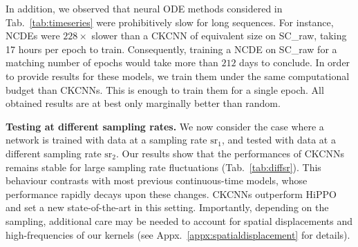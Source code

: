 \documentclass{article}
\begin{document}
In addition, we observed that neural ODE methods considered in Tab.~\ref{tab:timeseries} were prohibitively slow for long sequences. For instance, NCDEs were $228\times$ slower than a CKCNN of equivalent size on SC\_raw, taking 17 hours per epoch to train. Consequently, training a NCDE on SC\_raw for a matching number of epochs would take more than $212$ days to conclude. In order to provide results for these models, we train them under the same computational budget than CKCNNs. This is enough to train them for a single epoch. All obtained results are at best only marginally better than random.

\textbf{Testing at different sampling rates.} We now consider the case where a network is trained with data at a sampling rate $\mathrm{sr}_1$, and tested with data at a different sampling rate $\mathrm{sr}_2$. Our results show that the performances of CKCNNs remains stable for large sampling rate fluctuations (Tab.~\ref{tab:diffsr}). This behaviour contrasts with most previous continuous-time models, whose performance rapidly decays upon these changes. CKCNNs outperform HiPPO \citep{gu2020hippo} and set a new state-of-the-art in this setting. Importantly, depending on the sampling, additional care may be needed to account for spatial displacements and high-frequencies of our kernels (see Appx.~\ref{appx:spatialdisplacement} for details).
\end{document}
